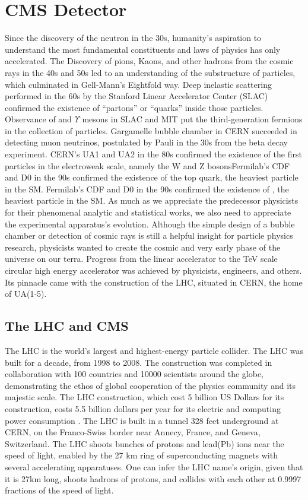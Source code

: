 \chapter{CMS Detector}\label{sec:detectors}
Since the discovery of the neutron in the 30s, humanity's aspiration to understand the most fundamental constituents and laws of physics has only accelerated.
The Discovery of pions, Kaons, and other hadrons from the cosmic rays in the 40s and 50s led to an understanding of the substructure of particles, which culminated in Gell-Mann's Eightfold way.
Deep inelastic scattering performed in the 60s by the Stanford Linear Accelerator Center (SLAC) confirmed the existence of ``partons'' or ``quarks'' inside those particles.
Observance of \PJGy and $\Upsilon$ mesons in SLAC and MIT put the third-generation fermions in the collection of particles.
Gargamelle bubble chamber in CERN succeeded in detecting muon neutrinos, postulated by Pauli in the 30s from the beta decay experiment.
CERN's UA1 and UA2 in the 80s confirmed the existence of the first particles in the electroweak scale, namely the W and Z bosonsFermilab's CDF and D0 in the 90s confirmed the existence of the top quark, the heaviest particle in the SM.
Fermilab's CDF and D0 in the 90s confirmed the existence of \PQt , the heaviest particle in the SM.
As much as we appreciate the predecessor physicists for their phenomenal analytic and statistical works, we also need to appreciate the experimental apparatus's evolution.
Although the simple design of a bubble chamber or detection of cosmic rays is still a helpful insight for particle physics research, physicists wanted to create the cosmic and very early phase of the universe on our terra.
Progress from the linear accelerator to the TeV scale circular high energy accelerator was achieved by physicists, engineers, and others.
Its pinnacle came with the construction of the LHC, situated in CERN, the home of UA(1-5).


\section{The LHC and CMS}
The LHC is the world's largest and highest-energy particle collider.
The LHC was built for a decade, from 1998 to 2008.
The construction was completed in collaboration with 100 countries and 10000 scientists around the globe, demonstrating the ethos of global cooperation of the physics community and its majestic scale.
The LHC construction, which cost 5 billion US Dollars for its construction, costs 5.5 billion dollars per year for its electric and computing power consumption \cite{LHCweb}.
The LHC is built in a tunnel 328 feet underground at CERN, on the Franco-Swiss border near Annecy, France, and  Geneva, Switzerland.
The LHC shoots bunches of protons and lead(Pb) ions near the speed of light, enabled by the 27 km ring of superconducting magnets with several accelerating apparatuses.
One can infer the LHC name's origin, given that it is 27km long, shoots hadrons of protons, and collides with each other at 0.9997 fractions of the speed of light.

